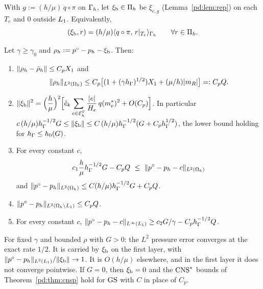 \begin{definition}\label{pd:def:xib}
With $g:=(h/\mu)\,q\circ\pi$ on $\Gamma_h$, let $\xi_{\mathrm b}\in\Pi_h$ be $\xi_{e,g}$ (Lemma~\ref{pd:lem:rep}) on each $T_e$ and $0$ outside $L_1$. Equivalently,
\[
(\xi_{\mathrm b},r)=(h/\mu)\langle q\circ\pi,\, r|_{T_e}\rangle_{\Gamma_h}\qquad\forall r\in\Pi_h .
\]
\end{definition}

\begin{theorem}[$\GS$ pressure]\label{pd:thm:gsp}
Let $\gamma\ge\gamma_0$ and $\rho_h:=p^\circ-p_h-\xi_{\mathrm b}$. Then:
\begin{enumerate}[label=(\alph*)]
\item $\lVert \rho_h-\bar\rho_h\rVert\le C_pX_1$ and
\[
\lVert \rho_h\rVert_{L^2(\Omega_h)}\le C_p\bigl[(1+(\gamma h_\Gamma)^{1/2})X_1+(\mu/h)|m_R|\bigr]=:C_pQ .
\]
\item $\displaystyle\lVert \xi_{\mathrm b}\rVert^2=\Bigl(\frac h\mu\Bigr)^2\Bigl[\hat c_k\sum_{e\in\mathcal E_h^\Gamma}\frac{|e|}{H_e}\,q(m_e^\ast)^2+O(C_p)\Bigr]$. In particular $c\,(h/\mu)h_\Gamma^{-1/2}G\le\lVert \xi_{\mathrm b}\rVert\le C\,(h/\mu)h_\Gamma^{-1/2}(G+C_ph_\Gamma^{1/2})$, the lower bound holding for $h_\Gamma\le h_0(G)$.
\item For every constant $c$,
\[
c_1\frac h\mu\hG^{-1/2}G-C_pQ\ \le\ \norm{p^\circ-p_h-c}_{L^2(\Oh)}
\]
and $\lVert p^\circ-p_h\rVert_{L^2(\Omega_h)}\le C(h/\mu)h_\Gamma^{-1/2}G+C_pQ$.
\item $\lVert p^\circ-p_h\rVert_{L^2(\Omega_h\setminus L_1)}\le C_pQ$.
\item For every constant $c$, $\lVert p^\circ-p_h-c\rVert_{L^\infty(L_1)}\ge c_2G/\gamma-C_ph_\Gamma^{-1/2}Q$.
\end{enumerate}
For fixed $\gamma$ and bounded $\rho$ with $G>0$: the $L^2$ pressure error converges at the exact rate $1/2$. It is carried by $\xi_{\mathrm b}$ on the first layer, with $\lVert p^\circ-p_h\rVert_{L^2(L_1)}/\lVert \xi_{\mathrm b}\rVert\to1$. It is $O(h/\mu)$ elsewhere, and in the first layer it does not converge pointwise. If $G=0$, then $\xi_{\mathrm b}=0$ and the $\mathrm{CNS}^\ast$ bounds of Theorem~\ref{pd:thm:cnsp} hold for $\GS$ with $C$ in place of $C_p$.
\end{theorem}

